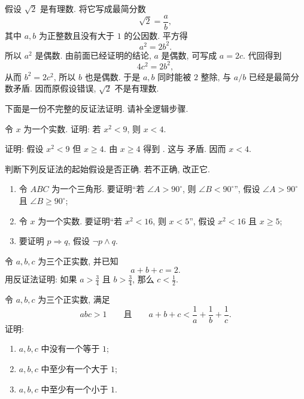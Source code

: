 \documentclass[usesamecnt, thmcnt=section, lang=cn, newtx, 10pt, scheme=chinese]{elegantbook}
\begin{document}
\begin{solution}
假设 $\sqrt2$ 是有理数. 将它写成最简分数
\[
 \sqrt2=\frac{a}{b},
\]
其中 $a,b$ 为正整数且没有大于 $1$ 的公因数. 平方得
\[
 a^2=2b^2.
\]
所以 $a^2$ 是偶数. 由前面已经证明的结论, $a$ 是偶数, 可写成 $a=2c$. 代回得到
\[
 4c^2=2b^2,
\]
从而 $b^2=2c^2$, 所以 $b$ 也是偶数. 于是 $a,b$ 同时能被 $2$ 整除, 与 $a/b$ 已经是最简分数矛盾. 因而原假设错误, $\sqrt2$ 不是有理数.
\end{solution}

\begin{exercise}
\label{ex:logic-14}
下面是一份不完整的反证法证明. 请补全逻辑步骤.

令 $x$ 为一个实数. 证明: 若 $x^2<9$, 则 $x<4$.

证明: 假设 $x^2<9$ 但 $x\geq4$. 由 $x\geq4$ 得到 \underline{\hspace{3cm}}. 这与 \underline{\hspace{3cm}} 矛盾. 因而 $x<4$.
\end{exercise}

\begin{exercise}
\label{ex:logic-15}
判断下列反证法的起始假设是否正确. 若不正确, 改正它.
\begin{enumerate}[label=\rm(\arabic*)]
  \item 令 $ABC$ 为一个三角形. 要证明``若 $\angle A>90^\circ$, 则 $\angle B<90^\circ$'', 假设 $\angle A>90^\circ$ 且 $\angle B\geq90^\circ$;
  \item 令 $x$ 为一个实数. 要证明``若 $x^2<16$, 则 $x<5$'', 假设 $x^2<16$ 且 $x\geq5$;
  \item 要证明 $p\Rightarrow q$, 假设 $\neg p\wedge q$.
\end{enumerate}
\end{exercise}

\begin{exercise}
\label{ex:logic-16}
令 $a,b,c$ 为三个正实数, 并已知
\[
 a+b+c=2.
\]
用反证法证明: 如果 $a>\frac34$ 且 $b>\frac34$, 那么 $c<\frac12$.
\end{exercise}


\begin{exercise}
\label{ex:basic-logic-09}
令 $a,b,c$ 为三个正实数, 满足
\[
 abc>1
 \qquad\text{且}\qquad
 a+b+c<\frac1a+\frac1b+\frac1c.
\]
证明:
\begin{enumerate}[label=\rm(\arabic*)]
  \item $a,b,c$ 中没有一个等于 $1$;
  \item $a,b,c$ 中至少有一个大于 $1$;
  \item $a,b,c$ 中至少有一个小于 $1$.
\end{enumerate}
\end{exercise}
\end{document}
